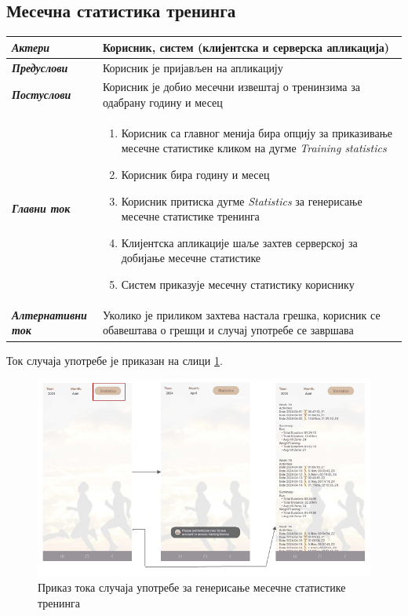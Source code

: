 \documentclass[12pt,oneside]{memoir}
\begin{document}
\newpage


\subsection*{Месечна статистика тренинга}
\begin{longtable}{p{0.23\linewidth} p{0.77\linewidth}}
 \hline
 \textit{\textbf{Актери}} & Корисник, систем (клијентска и серверска апликација) \\
\hline

\textit{\textbf{Предуслови}} & Корисник је пријављен на апликацију \\
 \hline
\textit{\textbf{Постуслови}} & Корисник је добио месечни извештај о тренинзима за одабрану годину и месец \\
 \hline
 \textit{\textbf{Главни ток}} &  
    \begin{enumerate}
        \item Корисник са главног менија бира опцију за приказивање месечне статистике кликом на дугме
        \textit{Training statistics}
        \item Корисник бира годину и месец
        \item Корисник притиска дугме \textit{Statistics} за генерисање месечне статистике тренинга
        \item Клијентска апликације шаље захтев серверској за добијање месечне статистике
        \item Систем приказује месечну статистику кориснику
    \end{enumerate}\\
 \hline
\textit{\textbf{Алтернативни ток}} & Уколико је приликом захтева настала грешка, корисник се обавештава о грешци и случај употребе се завршава \\
 \hline
 
\end{longtable}

\noindent Ток случаја употребе је приказан на слици \ref{pic:stats-flow}.

\begin{figure}[H]
  \centering
  \includegraphics[scale=0.85]{assets/pictures/usecases_flows/stats_flow.png}
    \caption{Приказ тока случаја употребе за генерисање месечне статистике тренинга}
  \label{pic:stats-flow}
\end{figure}
\end{document}
